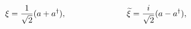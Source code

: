 \begin{equation}
\label{hermitic}
\xi=\frac{1}{\sqrt{2}}(a+a^{\dagger}), \hspace{1.0in}
{\widetilde \xi}=\frac{i}{\sqrt{2}}(a-a^{\dagger}), 
\end{equation}


